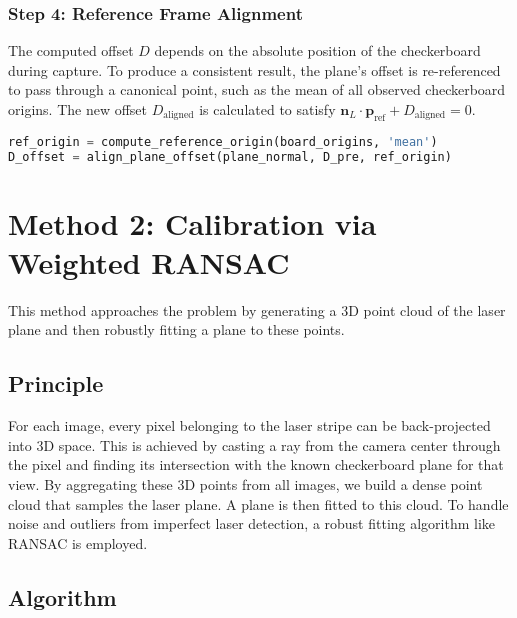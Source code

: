 \documentclass{article}
\begin{document}
\subsubsection{Step 4: Reference Frame Alignment}
The computed offset $D$ depends on the absolute position of the checkerboard during capture. To produce a consistent result, the plane's offset is re-referenced to pass through a canonical point, such as the mean of all observed checkerboard origins. The new offset $D_{\text{aligned}}$ is calculated to satisfy $\mathbf{n}_L \cdot \mathbf{p}_{\text{ref}} + D_{\text{aligned}} = 0$.
\begin{lstlisting}[language=Python]
ref_origin = compute_reference_origin(board_origins, 'mean')
D_offset = align_plane_offset(plane_normal, D_pre, ref_origin)
\end{lstlisting}

\section{Method 2: Calibration via Weighted RANSAC}
This method approaches the problem by generating a 3D point cloud of the laser plane and then robustly fitting a plane to these points.

\subsection{Principle}
For each image, every pixel belonging to the laser stripe can be back-projected into 3D space. This is achieved by casting a ray from the camera center through the pixel and finding its intersection with the known checkerboard plane for that view. By aggregating these 3D points from all images, we build a dense point cloud that samples the laser plane. A plane is then fitted to this cloud. To handle noise and outliers from imperfect laser detection, a robust fitting algorithm like RANSAC is employed.

\subsection{Algorithm}
\end{document}
